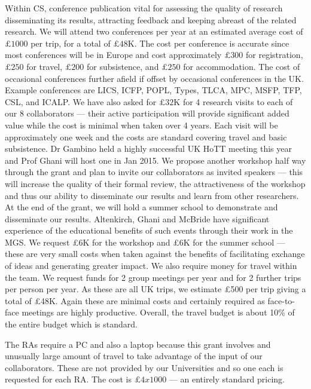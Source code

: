 \documentclass[a4paper,11pt]{article}
\begin{document}
 Within CS, conference publication vital
for assessing the quality of research disseminating its results,
attracting feedback and keeping abreast of the related research.  We
will attend two conferences per year at an estimated average cost of
$\pounds 1000$ per trip, for a total of $\pounds 48$K. The cost per
conference is accurate since most conferences will be in Europe and
cost approximately $\pounds 300$ for registration, $\pounds 250$ for
travel, $\pounds 200$ for subsistence, and $\pounds 250$ for
accommodation. The cost of occasional conferences further afield if
offset by occasional conferences in the UK. Example conferences are
LICS, ICFP, POPL, Types, TLCA, MPC, MSFP, TFP, CSL, and ICALP.  We
have also asked for $\pounds 32$K for 4 research visits to each of
our 8 collaborators --- their active participation will provide
significant added value while the cost is minimal when
taken over 4 years. Each visit will be approximately one week and the
costs are standard covering travel and basic subsistence. Dr
Gambino held a highly successful UK HoTT meeting this year and Prof
Ghani will host one in Jan 2015. We propose another workshop half way
through the grant and plan to invite  our collaborators as
invited speakers --- this will increase the quality of their formal
review, the attractiveness of the workshop and thus our ability to
disseminate our results and learn from other researchers. At the end
of the grant, we will hold a summer school to demonstrate and
disseminate our results. Altenkirch, Ghani and McBride have
significant experience of the educational benefits of such events
through their work in the MGS. We request \pounds 6K for the workshop
and \pounds 6K for the summer school --- these are very small costs
when taken against the benefits of facilitating exchange of ideas and
generating greater impact. We also require money for travel within the
team. We request funds for 2 group meetings per year and for 2 further
trips per person per year. As these are all UK trips, we estimate
\pounds 500 per trip giving a total of \pounds 48K. Again these are
minimal costs and certainly required as face-to-face meetings are
highly productive. Overall, the travel budget is about 10\% of the
entire budget which is standard.

\vspace{0.02in}

 The RAs require a PC and also a
laptop because this grant involves and unusually large amount of travel to take
advantage of the input of our collaborators. These are not provided by
our Universities and so one each is requested for each RA. The cost is
$\pounds 4x1000$ --- an entirely standard
pricing. 
\end{document}
